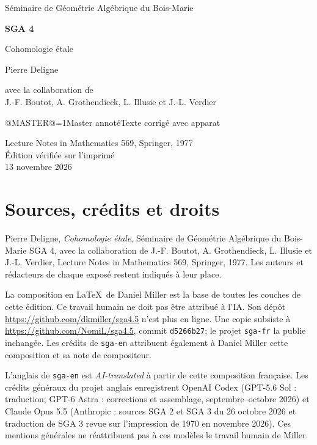 \documentclass[oneside]{book}
\makeatletter
\theoremstyle{sga-source}
\theoremstyle{sga-source-dash}
\theoremstyle{sga-source-dotdash}
\theoremstyle{sga-source-number-note-dash}
\theoremstyle{sga-source-note-number-dotdash}
\theoremstyle{sga-source-example-dotdash}
\theoremstyle{sga-source-inline-number}
\theoremstyle{sga-source-bare-number}
\theoremstyle{sga-source}
\providecommand\EditionIsMaster{@MASTER@}
\makeatother
\begin{document}
\begin{titlepage}
\centering
\vspace*{2cm}
{\Large Séminaire de Géométrie Algébrique du Bois-Marie\par}
\vspace{0.7cm}
{\Huge\bfseries SGA 4\textonehalf\par}
\vspace{0.8cm}
{\huge Cohomologie étale\par}
\vspace{1cm}
{\Large Pierre Deligne\par}
\vspace{0.5cm}
avec la collaboration de\\[0.3em]
J.-F. Boutot, A. Grothendieck, L. Illusie et J.-L. Verdier
\vfill
{\Large \ifnum\EditionIsMaster=1\relax Master annoté\else Texte corrigé avec apparat\fi\par}
\vspace{0.7cm}
Lecture Notes in Mathematics 569, Springer, 1977\\[0.4em]
Édition vérifiée sur l’imprimé\\
13 novembre 2026
\end{titlepage}

\chapter*{Sources, crédits et droits}
Pierre Deligne, \emph{Cohomologie étale}, Séminaire de Géométrie Algébrique
du Bois-Marie SGA 4\textonehalf, avec la collaboration de J.-F. Boutot,
A. Grothendieck, L. Illusie et J.-L. Verdier, Lecture Notes in Mathematics
569, Springer, 1977. Les auteurs et rédacteurs de chaque exposé restent
indiqués à leur place.

\medskip
La composition en \LaTeX\ de Daniel Miller est la base de toutes les couches
de cette édition. Ce travail humain ne doit pas être attribué à l’IA.
Son dépôt \url{https://github.com/dkmiller/sga4.5} n’est plus en ligne.
Une copie subsiste à \url{https://github.com/NomiL/sga4.5}, commit
\texttt{d5266b27}; le projet \texttt{sga-fr} la publie inchangée.
Les crédits de \texttt{sga-en} attribuent également à Daniel Miller cette
composition et sa note de compositeur.

\medskip
L’anglais de \texttt{sga-en} est \emph{AI-translated} à partir de cette
composition française. Les crédits généraux du projet anglais enregistrent
OpenAI Codex (GPT-5.6 Sol : traduction; GPT-6 Astra : corrections et
assemblage, septembre--octobre 2026) et Claude Opus 5.5 (Anthropic : sources
SGA 2 et SGA 3 du 26 octobre 2026 et traduction de SGA 3 revue sur
l’impression de 1970 en novembre 2026). Ces mentions générales ne
réattribuent pas à ces modèles le travail humain de Miller.
\end{document}
